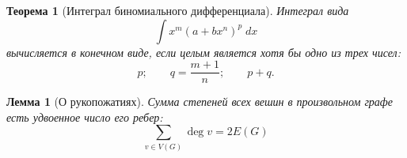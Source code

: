 \documentclass[a4paper,11pt]{article} %
\theoremstyle{plain}
\newtheorem{theorem}{Теорема}[section]
\theoremstyle{plain}
\newtheorem{lemma}{Лемма}[section]
\theoremstyle{remark}
\begin{document}
		\begin{theorem}[Интеграл биномиального дифференциала]
			Интеграл вида
			$$\displaystyle \int x^m \left( a + b x^n \right)^p \; dx$$
			вычисляется в конечном виде, если целым является хотя бы одно из трех чисел:
			$$p; \qquad q = \dfrac{m+1}{n}; \qquad p + q.$$
		\end{theorem}
	
		\begin{lemma}[О рукопожатиях]
			Сумма степеней всех вешин в произвольном графе есть удвоенное число его ребер:
			$$\sum \limits_{v \in V \left( G \right)} \deg{v} = 2 E \left( G \right)$$
		\end{lemma}
		
\end{document}
